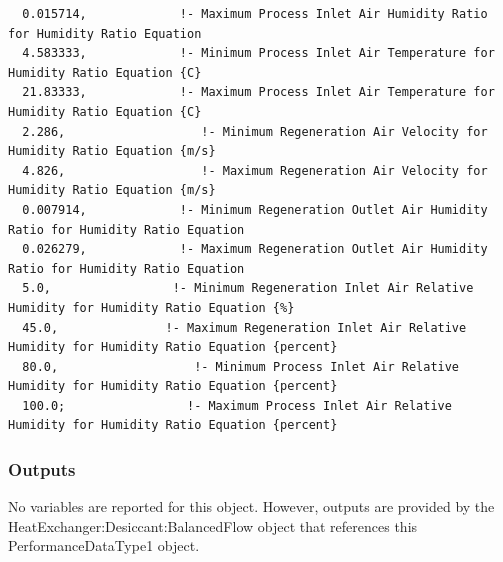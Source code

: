 \begin{lstlisting}
  0.015714,             !- Maximum Process Inlet Air Humidity Ratio for Humidity Ratio Equation
  4.583333,             !- Minimum Process Inlet Air Temperature for Humidity Ratio Equation {C}
  21.83333,             !- Maximum Process Inlet Air Temperature for Humidity Ratio Equation {C}
  2.286,                   !- Minimum Regeneration Air Velocity for Humidity Ratio Equation {m/s}
  4.826,                   !- Maximum Regeneration Air Velocity for Humidity Ratio Equation {m/s}
  0.007914,             !- Minimum Regeneration Outlet Air Humidity Ratio for Humidity Ratio Equation
  0.026279,             !- Maximum Regeneration Outlet Air Humidity Ratio for Humidity Ratio Equation
  5.0,                 !- Minimum Regeneration Inlet Air Relative Humidity for Humidity Ratio Equation {%}
  45.0,               !- Maximum Regeneration Inlet Air Relative Humidity for Humidity Ratio Equation {percent}
  80.0,                   !- Minimum Process Inlet Air Relative Humidity for Humidity Ratio Equation {percent}
  100.0;                 !- Maximum Process Inlet Air Relative Humidity for Humidity Ratio Equation {percent}
\end{lstlisting}

\subsubsection{Outputs}\label{outputs-3-008}

No variables are reported for this object. However, outputs are provided by the HeatExchanger:Desiccant:BalancedFlow object that references this PerformanceDataType1 object.